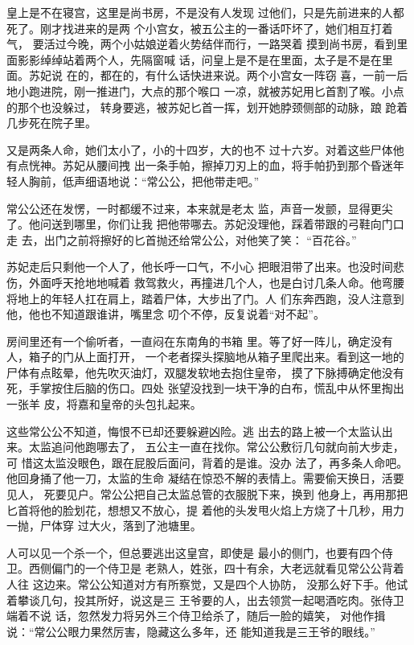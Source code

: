 皇上是不在寝宫，这里是尚书房，不是没有人发现
过他们，只是先前进来的人都死了。刚才找进来的是两
个小宫女，被五公主的一番话吓坏了，她们相互打着气，
要活过今晚，两个小姑娘逆着火势结伴而行，一路哭着
摸到尚书房，看到里面影影绰绰站着两个人，先隔窗喊
话，问皇上是不是在里面，太子是不是在里面。苏妃说
在的，都在的，有什么话快进来说。两个小宫女一阵窃
喜，一前一后地小跑进院，刚一推进门，大点的那个喉口
一凉，就被苏妃用匕首割了喉。小点的那个也没躲过，
转身要逃，被苏妃匕首一挥，划开她脖颈侧部的动脉，踉
跄着几步死在院子里。

又是两条人命，她们太小了，小的十四岁，大的也不
过十六岁。对着这些尸体他有点恍神。苏妃从腰间拽
出一条手帕，擦掉刀刃上的血，将手帕扔到那个昏迷年
轻人胸前，低声细语地说：“常公公，把他带走吧。”

常公公还在发愣，一时都缓不过来，本来就是老太
监，声音一发颤，显得更尖了。他问送到哪里，你们让我
把他带哪去。苏妃没理他，踩着带跟的弓鞋向门口走
去，出门之前将擦好的匕首抛还给常公公，对他笑了笑：
“百花谷。”

苏妃走后只剩他一个人了，他长呼一口气，不小心
把眼泪带了出来。也没时间悲伤，外面呼天抢地地喊着
救驾救火，再撞进几个人，也是白讨几条人命。他弯腰
将地上的年轻人扛在肩上，踏着尸体，大步出了门。人
们东奔西跑，没人注意到他，他也不知道跟谁讲，嘴里念
叨个不停，反复说着“对不起”。

房间里还有一个偷听者，一直闷在东南角的书箱
里。等了好一阵儿，确定没有人，箱子的门从上面打开，
一个老者探头探脑地从箱子里爬出来。看到这一地的
尸体有点眩晕，他先吹灭油灯，双腿发软地去抱住皇帝，
摸了下脉搏确定他没有死，手掌按住后脑的伤口。四处
张望没找到一块干净的白布，慌乱中从怀里掏出一张羊
皮，将嘉和皇帝的头包扎起来。

这些常公公不知道，悔恨不已却还要躲避凶险。逃
出去的路上被一个太监认出来。太监追问他跑哪去了，
五公主一直在找你。常公公敷衍几句就向前大步走，可
惜这太监没眼色，跟在屁股后面问，背着的是谁。没办
法了，再多条人命吧。他回身捅了他一刀，太监的生命
凝结在惊恐不解的表情上。需要偷天换日，活要见人，
死要见户。常公公把自己太监总管的衣服脱下来，换到
他身上，再用那把匕首将他的脸划花，想想又不放心，提
着他的头发甩火焰上方烧了十几秒，用力一抛，尸体穿
过大火，落到了池塘里。

人可以见一个杀一个，但总要逃出这皇宫，即使是
最小的侧门，也要有四个侍卫。西侧偏门的一个侍卫是
老熟人，姓张，四十有余，大老远就看见常公公背着人往
这边来。常公公知道对方有所察觉，又是四个人协防，
没那么好下手。他试着攀谈几句，投其所好，说这是三
王爷要的人，出去领赏一起喝酒吃肉。张侍卫端着不说
话，忽然发力将另外三个侍卫给杀了，随后一脸的嬉笑，
对他作揖说：“常公公眼力果然厉害，隐藏这么多年，还
能知道我是三王爷的眼线。”

